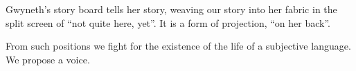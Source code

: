 

Gwyneth's story board tells her story, weaving our story into her
fabric in the split screen of ``not quite here, yet''.  It is a form
of projection, ``on her back''.  

From such positions we fight for the existence of the life of a
subjective language.  We propose a voice.


\bye
